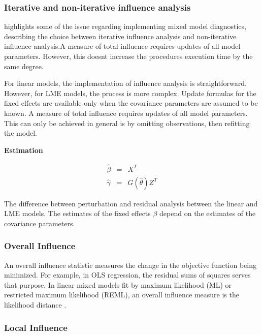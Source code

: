 \documentclass[12pt, a4paper]{report}
\theoremstyle{plain}
\theoremstyle{definition}
\theoremstyle{remark}
\begin{document}
\subsubsection{Iterative and non-iterative influence analysis}
\citet{schabenberger} highlights some of the issue regarding implementing mixed model diagnostics, describing  the choice between  iterative influence analysis and  non-iterative influence analysis.A measure of total influence requires updates of all model parameters.
However, this doesnt increase the procedures execution time by the same degree.
	
For linear models, the implementation of influence analysis is straightforward. However, for LME models, the process is more complex. Update formulas for the fixed effects are available only when the covariance parameters are assumed to be known. A measure of total influence requires updates of all model parameters. This can only be achieved in general is by omitting observations, then refitting the model.

	
	
	\noindent \textbf{Estimation}
	
	\begin{eqnarray}
		\hat{\beta} &=& X^{T} \\
		\hat{\gamma} &=& G(\hat{\theta})Z^{T}
	\end{eqnarray}
	
	The difference between perturbation and residual analysis between the linear and LME models.
	The estimates of the fixed effects $\beta$ depend on the estimates of the covariance parameters.
	
	
\subsubsection{Overall Influence}
An overall influence statistic measures the change in the objective function being minimized. For example, in
OLS regression, the residual sums of squares serves that purpose. In linear mixed models fit by
 maximum likelihood (ML) or  restricted maximum likelihood (REML), an overall influence measure is the  likelihood distance \citep{CookWeisberg}.
		
\subsubsection{Local Influence}
\end{document}
